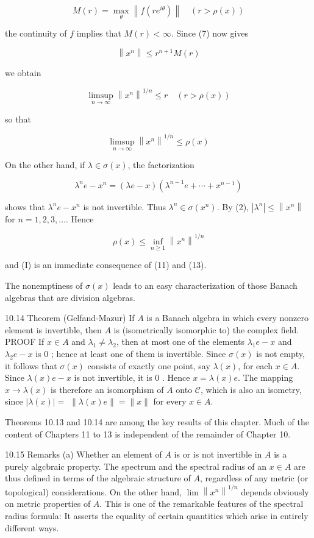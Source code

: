\documentclass[10pt]{article}
\begin{document}
$$
M(r)=\max _{\theta}\left\|f\left(r e^{i \theta}\right)\right\| \quad(r>\rho(x))
$$

the continuity of $f$ implies that $M(r)<\infty$. Since (7) now gives

$$
\left\|x^{n}\right\| \leq r^{n+1} M(r)
$$

we obtain

$$
\limsup _{n \rightarrow \infty}\left\|x^{n}\right\|^{1 / n} \leq r \quad(r>\rho(x))
$$

so that

$$
\limsup _{n \rightarrow \infty}\left\|x^{n}\right\|^{1 / n} \leq \rho(x)
$$

On the other hand, if $\lambda \in \sigma(x)$, the factorization

$$
\lambda^{n} e-x^{n}=(\lambda e-x)\left(\lambda^{n-1} e+\cdots+x^{n-1}\right)
$$

shows that $\lambda^{n} e-x^{n}$ is not invertible. Thus $\lambda^{n} \in \sigma\left(x^{n}\right)$. By (2), $\left|\lambda^{n}\right| \leq\left\|x^{n}\right\|$ for $n=1,2,3, \ldots$. Hence

$$
\rho(x) \leq \inf _{n \geq 1}\left\|x^{n}\right\|^{1 / n}
$$

and (I) is an immediate consequence of (11) and (13).

The nonemptiness of $\sigma(x)$ leads to an easy characterization of those Banach algebras that are division algebras.

10.14 Theorem (Gelfand-Mazur) If $A$ is a Banach algebra in which every nonzero element is invertible, then $A$ is (isometrically isomorphic to) the complex field. PROOF If $x \in A$ and $\lambda_{1} \neq \lambda_{2}$, then at most one of the elements $\lambda_{1} e-x$ and $\lambda_{2} e-x$ is 0 ; hence at least one of them is invertible. Since $\sigma(x)$ is not empty, it follows that $\sigma(x)$ consists of exactly one point, say $\lambda(x)$, for each $x \in A$. Since $\lambda(x) e-x$ is not invertible, it is 0 . Hence $x=\lambda(x) e$. The mapping $x \rightarrow \lambda(x)$ is therefore an isomorphism of $A$ onto $\mathscr{C}$, which is also an isometry, since $|\lambda(x)|=$ $\|\lambda(x) e\|=\|x\|$ for every $x \in A$.

Theorems 10.13 and 10.14 are among the key results of this chapter. Much of the content of Chapters 11 to 13 is independent of the remainder of Chapter 10.

10.15 Remarks (a) Whether an element of $A$ is or is not invertible in $A$ is a purely algcbraic property. The spectrum and the spectral radius of an $x \in A$ are thus defined in terms of the algebraic structure of $A$, regardless of any metric (or topological) considerations. On the other hand, $\lim \left\|x^{n}\right\|^{1 / n}$ depends obviously on metric properties of $A$. This is one of the remarkable features of the spectral radius formula: It asserts the equality of certain quantities which arise in entirely different ways.
\end{document}
